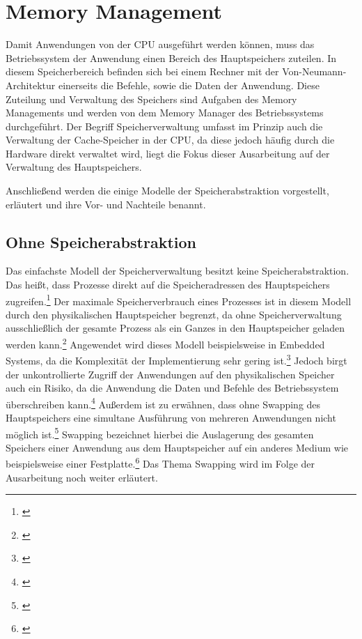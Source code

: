 \section{Memory Management}
\label{sec:MemoryManagement}
Damit Anwendungen von der CPU ausgeführt werden können, muss das Betriebssystem der Anwendung einen Bereich des Hauptspeichers zuteilen. In diesem Speicherbereich befinden sich bei einem Rechner mit der Von-Neumann-Architektur einerseits die Befehle, sowie die Daten der Anwendung. Diese Zuteilung und Verwaltung des Speichers sind Aufgaben des Memory Managements und werden von dem Memory Manager des Betriebssystems durchgeführt. Der Begriff Speicherverwaltung umfasst im Prinzip auch die Verwaltung der Cache-Speicher in der CPU, da diese jedoch häufig durch die Hardware direkt verwaltet wird, liegt die Fokus dieser Ausarbeitung auf der Verwaltung des Hauptspeichers.

Anschließend werden die einige Modelle der Speicherabstraktion vorgestellt, erläutert und ihre Vor- und Nachteile benannt.

\subsection{Ohne Speicherabstraktion}
\label{subsec:OhneSpeicherabstraktion}
Das einfachste Modell der Speicherverwaltung besitzt keine Speicherabstraktion. Das heißt, dass Prozesse direkt auf die Speicheradressen des Hauptspeichers zugreifen.\footnote{\cite[S.~239]{Tanenbaum.2016}} Der maximale Speicherverbrauch eines Prozesses ist in diesem Modell durch den physikalischen Hauptspeicher begrenzt, da ohne Speicherverwaltung ausschließlich der gesamte Prozess als ein Ganzes in den Hauptspeicher geladen werden kann.\footnote{\cite[S.~239]{Tanenbaum.2016}} Angewendet wird dieses Modell beispielsweise in Embedded Systems, da die Komplexität der Implementierung sehr gering ist.\footnote{\cite[S.~242]{Tanenbaum.2016}} Jedoch birgt der unkontrollierte Zugriff der Anwendungen auf den physikalischen Speicher auch ein Risiko, da die Anwendung die Daten und Befehle des Betriebssystem überschreiben kann.\footnote{\cite[S.~241]{Tanenbaum.2016}} Außerdem ist zu erwähnen, dass ohne Swapping des Hauptspeichers eine simultane  Ausführung von mehreren Anwendungen nicht möglich ist.\footnote{\cite[S.~241]{Tanenbaum.2016}} Swapping bezeichnet hierbei die Auslagerung des gesamten Speichers einer Anwendung aus dem Hauptspeicher auf ein anderes Medium wie beispielsweise einer Festplatte.\footnote{\cite[S.~241]{Tanenbaum.2016}} Das Thema Swapping wird im Folge der Ausarbeitung noch weiter erläutert.

